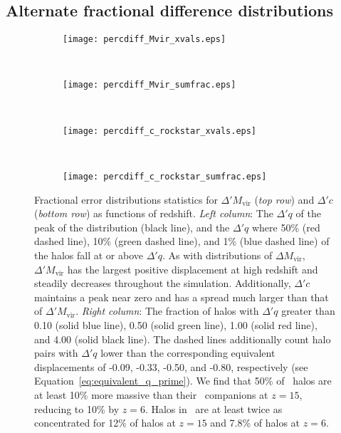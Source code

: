 \subsection{Alternate fractional difference distributions}


\begin{figure*}[t]
	\centering
	\begin{subfigure}{}
		\texttt{[image: percdiff\_Mvir\_xvals.eps]}
	\end{subfigure}
	~
	\begin{subfigure}{}
		\texttt{[image: percdiff\_Mvir\_sumfrac.eps]}
	\end{subfigure}
	\\
	\begin{subfigure}{}
		\texttt{[image: percdiff\_c\_rockstar\_xvals.eps]}
	\end{subfigure}
	~
	\begin{subfigure}{}
		\texttt{[image: percdiff\_c\_rockstar\_sumfrac.eps]}
	\end{subfigure}
	\caption[Fractional error distribution statistics as functions of redshift]{\footnotesize Fractional error distributions statistics for $\Delta' M_{\mathrm{vir}}$ (\textit{top row}) and $\Delta' c$ (\textit{bottom row}) as functions of redshift.  \textit{Left column}:  The $\Delta' q$ of the peak of the distribution (black line), and the $\Delta' q$ where 50\% (red dashed line), 10\% (green dashed line), and 1\% (blue dashed line) of the halos fall at or above $\Delta' q$.  As with distributions of $\Delta M_{\mathrm{vir}}$, $\Delta' M_{\mathrm{vir}}$ has the largest positive displacement at high redshift and steadily decreases throughout the simulation.  Additionally, $\Delta' c$ maintains a peak near zero and has a spread much larger than that of $\Delta' M_{\mathrm{vir}}$.  \textit{Right column}:  The fraction of halos with $\Delta' q$ greater than 0.10 (solid blue line), 0.50 (solid green line), 1.00 (solid red line), and 4.00 (solid black line).  The dashed lines additionally count halo pairs with $\Delta' q$ lower than the corresponding equivalent displacements of -0.09, -0.33, -0.50, and -0.80, respectively (see Equation~\ref{eq:equivalent_q_prime}).  We find that 50\% of \lpt\ halos are at least 10\% more massive than their \za\ companions at $z = 15$, reducing to 10\% by $z = 6$.  Halos in \lpt\ are at least twice as concentrated for 12\% of halos at $z = 15$ and 7.8\% of halos at $z = 6$.}
	\label{fig:frac_err_trends}
\end{figure*}

